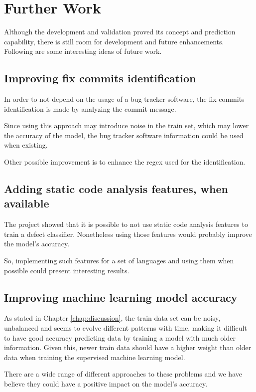 \section{Further Work}

Although the development and validation proved its concept and prediction capability, there is still room for development and future enhancements. Following are
some interesting ideas of future work.

\subsection{Improving fix commits identification}

In order to not depend on the usage of a bug tracker software, the fix commits identification is made by analyzing the commit message. 

Since using this approach may introduce noise in the train set, which may lower the accuracy of the model, the bug tracker software information could be used when existing.

Other possible improvement is to enhance the regex used for the identification.

\subsection{Adding static code analysis features, when available}

The project showed that it is possible to not use static code analysis features to train a defect classifier. Nonetheless using those features would probably improve the model's accuracy. 

So, implementing such features for a set of languages and using them when possible could present interesting results.

\subsection{Improving machine learning model accuracy}

As stated in Chapter \ref{chap:discussion}, the train data set can be noisy, unbalanced and seems to evolve different patterns with time, making it difficult to have good accuracy predicting data by training a model with much older information. Given this, newer train data should have a higher weight than older data when training the supervised machine learning model.

There are a wide range of different approaches to these problems and we have believe they could have a positive impact on the model's accuracy.

